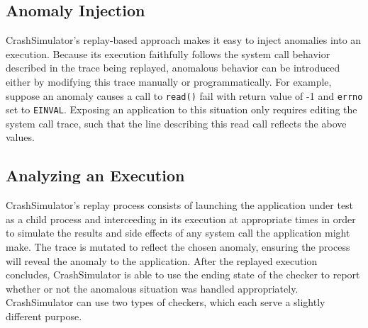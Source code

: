     \subsection{Anomaly Injection}

    CrashSimulator's replay-based approach makes it easy to inject anomalies
    into an execution.  
    Because its execution faithfully
    follows the system call behavior described in the trace being
    replayed, anomalous behavior can be introduced either by modifying
    this trace manually or programmatically.
    For example, suppose an anomaly causes a
    call to {\tt read()} fail with return value of -1 and {\tt errno} set to
    {\tt EINVAL}.  Exposing an application to this situation only requires
    editing the system call trace, such that the line describing this read call
    reflects the above values.



    \subsection{Analyzing an Execution}

    CrashSimulator's replay process consists of launching the
    application under test as a child process and interceeding in its execution
    at appropriate times in order to simulate the results and side effects of any
    system call the application might make.
    The trace is mutated to reflect the chosen anomaly, ensuring the process
    will reveal the anomaly to the application.
    After the replayed execution
    concludes, CrashSimulator is able to use the ending state of the checker to
    report whether or not the anomalous situation was handled appropriately.
    CrashSimulator
    can use two types of checkers, which each serve a slightly different purpose.

